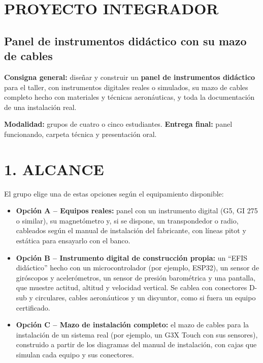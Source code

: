 \clearpage
\section*{PROYECTO INTEGRADOR}
\subsection*{Panel de instrumentos didáctico con su mazo de cables}

\begin{recuadro}
\textbf{Consigna general:} diseñar y construir un \textbf{panel de instrumentos didáctico} para el
taller, con instrumentos digitales reales o simulados, su mazo de cables completo hecho con
materiales y técnicas aeronáuticas, y toda la documentación de una instalación real.

\textbf{Modalidad:} grupos de cuatro o cinco estudiantes. \textbf{Entrega final:} panel funcionando,
carpeta técnica y presentación oral.
\end{recuadro}

\section*{1. ALCANCE}
El grupo elige una de estas opciones según el equipamiento disponible:
\begin{itemize}
  \item \textbf{Opción A -- Equipos reales:} panel con un instrumento digital (G5, GI 275 o
        similar), su magnetómetro y, si se dispone, un transpondedor o radio, cableados según el
        manual de instalación del fabricante, con líneas pitot y estática para ensayarlo con el
        banco.
  \item \textbf{Opción B -- Instrumento digital de construcción propia:} un ``EFIS didáctico''
        hecho con un microcontrolador (por ejemplo, ESP32), un sensor de giróscopos y
        acelerómetros, un sensor de presión barométrica y una pantalla, que muestre actitud,
        altitud y velocidad vertical. Se cablea con conectores D-sub y circulares, cables
        aeronáuticos y un disyuntor, como si fuera un equipo certificado.
  \item \textbf{Opción C -- Mazo de instalación completo:} el mazo de cables para la instalación de
        un sistema real (por ejemplo, un G3X Touch con sus sensores), construido a partir de los
        diagramas del manual de instalación, con cajas que simulan cada equipo y sus conectores.
\end{itemize}

